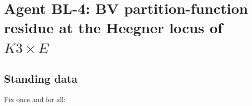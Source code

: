 %
%
%

\chapter*{Agent BL-4: BV partition-function residue at the Heegner locus of $K3 \times E$}

\section*{Standing data}

Fix once and for all:

